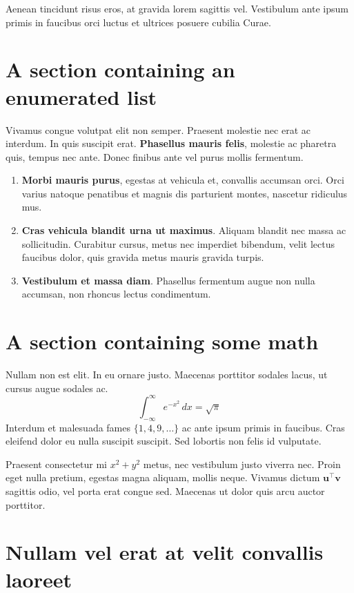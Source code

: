 \documentclass[12pt]{beamer}
\begin{document}
\begin{frame}[t]
\begin{multicols}{2}
Aenean tincidunt risus eros, at gravida lorem sagittis vel. Vestibulum ante ipsum primis in faucibus orci luctus et ultrices posuere cubilia Curae.

\section{A section containing an enumerated list}

Vivamus congue volutpat elit non semper. Praesent molestie nec erat ac interdum. In quis suscipit erat. \alert{\textbf{Phasellus mauris felis}}, molestie ac pharetra quis, tempus nec ante. Donec finibus ante vel purus mollis fermentum.

\begin{enumerate}
    \item \textbf{Morbi mauris purus}, egestas at vehicula et, convallis accumsan orci. Orci varius natoque penatibus et magnis dis parturient montes, nascetur ridiculus mus.
    \item \textbf{Cras vehicula blandit urna ut maximus}. Aliquam blandit nec massa ac sollicitudin. Curabitur cursus, metus nec imperdiet bibendum, velit lectus faucibus dolor, quis gravida metus mauris gravida turpis.
    \item \textbf{Vestibulum et massa diam}. Phasellus fermentum augue non nulla accumsan, non rhoncus lectus condimentum.
\end{enumerate}

\section{A section containing some math}

Nullam non est elit. In eu ornare justo. Maecenas porttitor sodales lacus, ut cursus augue sodales ac.
$$
    \int_{-\infty}^{\infty} e^{-x^2}\,dx = \sqrt{\pi}
$$
Interdum et malesuada fames $\{1, 4, 9, \ldots\}$ ac ante ipsum primis in faucibus. Cras eleifend dolor eu nulla suscipit suscipit. Sed lobortis non felis id vulputate.

Praesent consectetur mi $x^2 + y^2$ metus, nec vestibulum justo viverra nec. Proin eget nulla pretium, egestas magna aliquam, mollis neque. Vivamus dictum $\bm{u}^\intercal\bm{v}$ sagittis odio, vel porta erat congue sed. Maecenas ut dolor quis arcu auctor porttitor.

\columnbreak

\section{Nullam vel erat at velit convallis laoreet}


\end{multicols}
\end{frame}
\end{document}
